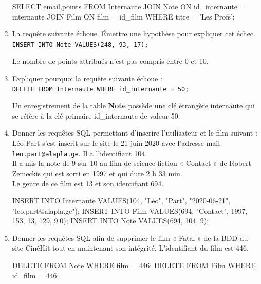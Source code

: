 \documentclass[a4paper,10pt]{article}
\begin{document}
\begin{enumerate}[\bfseries 1.]
\begin{sql}
SELECT email,points FROM Internaute
    JOIN Note ON id_internaute = internaute
    JOIN Film ON film = id_film
WHERE titre = 'Les Profs';
\end{sql}

\item La requête suivante échoue. Émettre une hypothèse pour expliquer cet échec.\\
\texttt{INSERT INTO Note VALUES(248, 93, 17);}

\begin{encadre}[Réponse]
Le nombre de points attribués n'est pas compris entre 0 et 10.
\end{encadre}

\item Expliquer pourquoi la requête suivante échoue :\\
\texttt{DELETE FROM Internaute WHERE id_internaute = 50;}\\

\begin{encadre}[Réponse]
Un enregistrement de la table \textbf{Note} possède une clé étrangère internaute qui se réfère à la clé primaire id\_internaute de valeur 50.
\end{encadre}


\item Donner les requêtes SQL permettant d'inscrire l'utilisateur et le film suivant :\\
Léo Part s'est inscrit sur le site le 21 juin 2020 avec l'adresse mail \texttt{leo.part@alapla.ge}. Il a l'identifiant 104.\\
Il a mis la note de 9 sur 10 au film de science-fiction « Contact » de Robert Zemeckis qui est sorti en 1997 et qui dure 2 h 33 min.\\
Le genre de ce film est 13 et son identifiant 694.\\

\begin{sql}
INSERT INTO Internaute VALUES(104, "Léo", "Part", "2020-06-21", "leo.part@alapla.ge");
INSERT INTO Film VALUES(694, "Contact", 1997, 153, 13, 129, 9.0);
INSERT INTO Note VALUES(694, 104, 9);
\end{sql}

\item Donner les requêtes SQL afin de supprimer le film « Fatal » de la BDD du site CinéHit tout en maintenant son intégrité. L'identifiant du film est 446.

\begin{sql}
DELETE FROM Note WHERE film = 446;
DELETE FROM Film WHERE id_film = 446;
\end{sql}
\end{enumerate}
\end{document}
